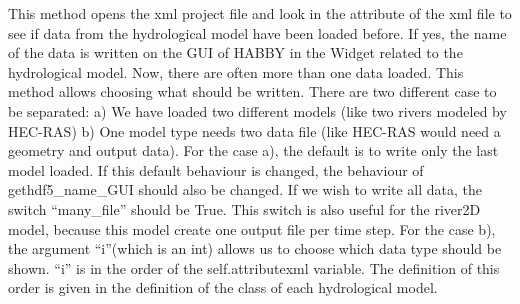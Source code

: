 \documentclass[letterpaper,10pt,english]{sphinxmanual}
\begin{document}
\begin{fulllineitems}
\begin{fulllineitems}
This method opens the xml project file and look in the attribute of the xml file to see if data from the
hydrological model have been loaded before. If yes, the name of the data is written on the GUI of HABBY in the
Widget related to the hydrological model. Now, there are often more than one data loaded. This method allows
choosing what should be written. There are two different case to be separated: a) We have loaded two different
models (like two rivers modeled by HEC-RAS) b) One model type needs two data file (like HEC-RAS would need a
geometry and output data). For the case a), the default is to write only the last model loaded. If this
default behaviour is changed, the behaviour of gethdf5\_name\_GUI should also be changed. If we wish to
write all data, the switch “many\_file” should be True. This switch is also useful for the river2D model, because
this model create one output file per time step. For the case b), the argument “i”(which is an int) allows us to
choose which data type should be shown. “i” is in the order of the self.attributexml variable. The definition of
this order is given in the definition of the class of each hydrological model.

\end{fulllineitems}


\end{fulllineitems}

\end{document}
